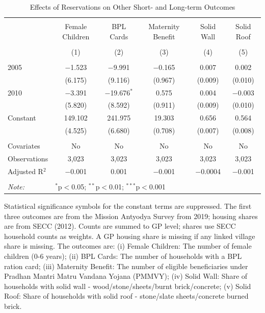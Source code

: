 \begin{table}[!htbp]
\centering
\begin{threeparttable}

  \caption{Effects of Reservations on Other Short- and Long-term Outcomes} 
  \label{raj_shrug_other_05_10} 
\scriptsize 
\begin{tabular}{@{\extracolsep{0pt}}lccccc} 
\\[-1.8ex]\hline 
\hline \\[-1.8ex] 
 & Female Children & BPL Cards & Maternity Benefit & Solid Wall & Solid Roof \\ 
\\[-1.8ex] & (1) & (2) & (3) & (4) & (5)\\ 
\hline \\[-1.8ex] 
 2005 & $-$1.523 & $-$9.991 & $-$0.165 & 0.007 & 0.002 \\ 
  & (6.175) & (9.116) & (0.967) & (0.009) & (0.010) \\ 
  2010 & $-$3.391 & $-$19.676$^{*}$ & 0.575 & 0.004 & $-$0.003 \\ 
  & (5.820) & (8.592) & (0.911) & (0.009) & (0.010) \\ 
  Constant & 149.102 & 241.975 & 19.303 & 0.656 & 0.564 \\ 
  & (4.525) & (6.680) & (0.708) & (0.007) & (0.008) \\ 
 \hline \\[-1.8ex] 
Covariates & No & No & No & No & No \\ 
Observations & 3,023 & 3,023 & 3,023 & 3,023 & 3,023 \\ 
Adjusted R$^{2}$ & $-$0.001 & 0.001 & $-$0.001 & $-$0.0004 & $-$0.001 \\ 
\hline 
\hline \\[-1.8ex] 
\textit{Note:}  & \multicolumn{5}{l}{$^{*}$p$<$0.05; $^{**}$p$<$0.01; $^{***}$p$<$0.001} \\ 
\end{tabular} 
\begin{tablenotes}[flushleft]
\scriptsize
\item[] Statistical significance symbols for the constant terms are suppressed. The first three outcomes are from the Mission Antyodya Survey from
    2019; housing shares are from SECC (2012). Counts are summed to GP
    level; shares use SECC household counts as weights. A GP housing
    share is missing if any linked village share is missing. The outcomes
    are: (i) Female Children: The number of female children (0-6 years);
    (ii) BPL Cards: The number of households with a BPL ration card;
    (iii) Maternity Benefit: The number of eligible beneficiaries under
    Pradhan Mantri Matru Vandana Yojana (PMMVY); (iv) Solid Wall: Share
    of households with solid wall - wood/stone/sheets/burnt
    brick/concrete; (v) Solid Roof: Share of households with solid roof -
    stone/slate sheets/concrete burned brick.
\end{tablenotes}
\end{threeparttable}
\end{table}
